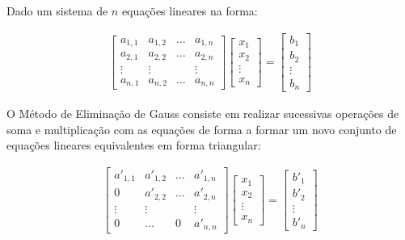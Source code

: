 \documentclass[final,5p]{elsarticle}
\numberwithin{equation}{section}
\begin{document}
        Dado um sistema de $n$ equações lineares na forma:

        \begin{align}
            \left[
                \begin{array}{cccc}
                    a_{1,1}    & a_{1,2}    & \ldots & a_{1,n} \\
                    a_{2,1}    & a_{2,2}    & \ldots & a_{2,n} \\
                    \vdots     & \vdots     &        & \vdots  \\
                    a_{n,1}    & a_{n,2}    & \ldots & a_{n,n}
                \end{array}
            \right]
            \begin{bmatrix}
                x_{1}  \\
                x_{2}  \\
                \vdots \\
                x_{n}
            \end{bmatrix}
            =
            \begin{bmatrix}
                b_{1}  \\
                b_{2}  \\
                \vdots \\
                b_{n}
            \end{bmatrix}
        \end{align}


            O Método de Eliminação de Gauss consiste em realizar sucessivas operações de soma e multiplicação com as equações de forma a formar um novo conjunto de equações lineares equivalentes em forma triangular:

            \begin{align}
                \left[
                    \begin{array}{cccc}
                        a'_{1,1}   & a'_{1,2}   & \ldots & a'_{1,n} \\
                        0          & a'_{2,2}   & \ldots & a'_{2,n} \\
                        \vdots     & \vdots     &        & \vdots   \\
                        0          & \ldots     & 0      & a'_{n,n}
                    \end{array}
                \right]
                \begin{bmatrix}
                    x_{1}  \\
                    x_{2}  \\
                    \vdots \\
                    x_{n}
                \end{bmatrix}
                =
                \begin{bmatrix}
                    b'_{1}  \\
                    b'_{2}  \\
                    \vdots \\
                    b'_{n}
                \end{bmatrix}
        \end{align}
\end{document}
